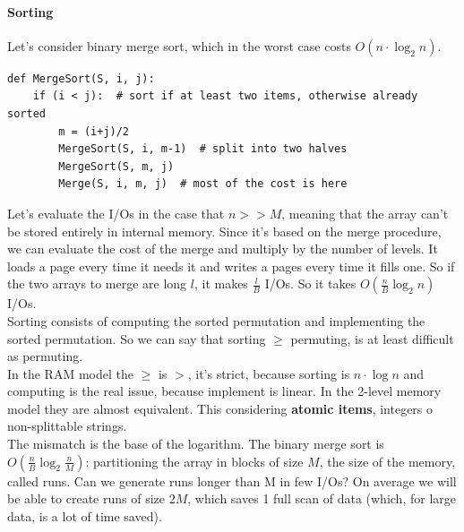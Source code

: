 \documentclass[10pt]{report}
\begin{document}
\paragraph{Sorting} Let's consider binary merge sort, which in the worst case costs $O(n\cdot \log_2 n)$.
\begin{lstlisting}[style=myPython]
def MergeSort(S, i, j):
	if (i < j):  # sort if at least two items, otherwise already sorted
		m = (i+j)/2
		MergeSort(S, i, m-1)  # split into two halves
		MergeSort(S, m, j)
		Merge(S, i, m, j)  # most of the cost is here
\end{lstlisting}
Let's evaluate the I/Os in the case that $n >> M$, meaning that the array can't be stored entirely in internal memory. Since it's based on the merge procedure, we can evaluate the cost of the merge and multiply by the number of levels. It loads a page every time it needs it and writes a pages every time it fills one. So if the two arrays to merge are long $l$, it makes $\frac{l}{B}$ I/Os. So it takes $O(\frac{n}{B} \log_2 n)$ I/Os.\\
Sorting consists of computing the sorted permutation and implementing the sorted permutation. So we can say that sorting $\geq$ permuting, is at least difficult as permuting.\\
In the RAM model the $\geq$ is $>$, it's strict, because sorting is $n\cdot\log n$ and computing is the real issue, because implement is linear. In the 2-level memory model they are almost equivalent. This considering \textbf{atomic items}, integers o non-splittable strings.\\
The mismatch is the base of the logarithm. The binary merge sort is $O(\frac{n}{B} \log_2 \frac{n}{M})$: partitioning the array in blocks of size $M$, the size of the memory, called runs. Can we generate runs longer than M in few I/Os? On average we will be able to create runs of size $2M$, which saves 1 full scan of data (which, for large data, is a lot of time saved).
\end{document}
